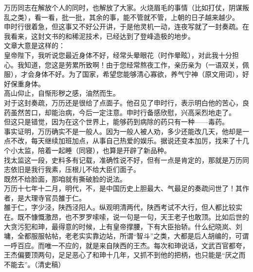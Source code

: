\begin{multicols}{\theparacolNo}
万历同志在解放个人的同时，也解放了大家。火烧眉毛的事情（比如打仗，阴谋叛乱之类），看一看，批一批，其余的事，能不管就不管，上朝的日子越来越少。\\

申时行很着急，但这事又不好公开讲，于是他灵机一动，连夜写就了一封奏疏。在我看来，这封文书的和稀泥技术，已经达到了登峰造极的地步。\\

文章大意是这样的：\\

皇帝陛下，我听说您最近身体不好，经常头晕眼花（时作晕眩），对此我十分担心。我知道，您这是劳累所致啊！由于您经常熬夜工作，亲历亲为（一语双关，佩服），才会身体不好。为了国家，希望您能够清心寡欲，养气宁神（原文用词），好好保重身体。\\

高山仰止，自惭形秽之感，油然而生。\\

对于这封奏疏，万历还是很给了点面子。他召见了申时行，表示明白他的苦心，良药虽然苦口，却能治病，今后一定注意。申时行备感欣慰，兴高采烈地走了。\\

但这只是错觉，因为在这个世界上，能够药到病除的药只有一种——毒药。\\

事实证明，万历确实不是一般人。因为一般人被人劝，多少还能改几天，他却是一点不改，每天继续加班加点，从事自己热爱的娱乐。据说还变本加厉，找来了十几个小太监，陪着一起睡（同寝），也算是开辟了新品种。\\

找太监这一段，史料多有记载，准确性说不好，但有一点是肯定的，那就是万历同志依旧是我行我素，压根儿不给大臣们面子。\\

既然不给脸面，那咱就有撕破脸的说法。\\

万历十七年十二月，明代，不，是中国历史上胆最大、气最足的奏疏问世了！其作者，是大理寺官员雒于仁。\\

雒于仁，字少泾，陕西泾阳人。纵观明清两代，陕西考试不大行，但人都比较实在。既不慷慨激昂，也不罗罗嗦嗦，说一句是一句，天王老子也敢顶。比如后世的大贪污犯和珅，最得意的时候，上有皇帝撑腰，下有大臣抬轿。什么纪晓岚、刘墉，全都服服帖帖，老老实实靠边站，所谓“智斗”之类，大都是后人胡编的，可谓一呼百应。而唯一不应的，就是来自陕西的王杰。每次和珅说话，文武百官都夸，王杰偏要顶两句，足足恶心了和珅十几年，又抓不到他的把柄，也只能是“厌之而不能去”。（清史稿）\\


\end{multicols}
